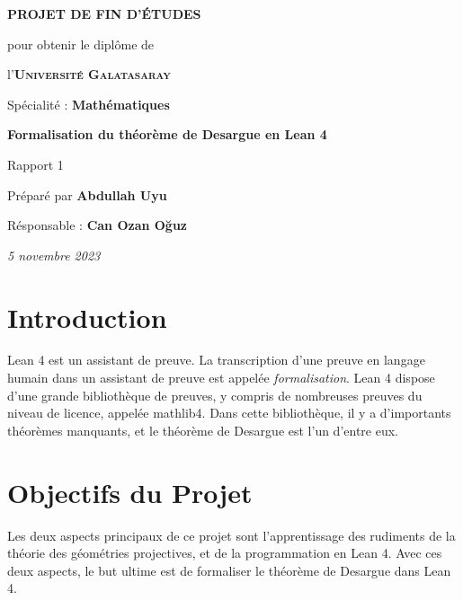 \documentclass[12pt, oneside]{memoir}
\theoremstyle{definition}
\begin{document}
\thispagestyle{empty}
\begin{center}
  \vspace*{\fill}
  

  \vspace{1cm}
  \large{\textbf{PROJET DE FIN D'ÉTUDES}}

  \vspace{0.5cm}
  {\small pour obtenir le diplôme de}

  \vspace{0.5cm}
  l'\textsc{\textbf{Université Galatasaray}}

  {\small Spécialité : \textbf{Mathématiques}}

  \vspace{2.25cm}
  {\Large\textbf{Formalisation du théorème de Desargue en Lean 4}}

  Rapport 1

  \vspace{1.25cm}
  Préparé par \textbf{Abdullah Uyu}

  Résponsable : \textbf{Can Ozan Oğuz}

  \vspace{2.25cm}
  \textit{5 novembre 2023}
  \vspace*{\fill}
\end{center}
\clearpage
{}
\section*{Introduction}
Lean 4 est un assistant de preuve. La transcription d'une preuve en
langage humain dans un assistant de preuve est appelée
\textit{formalisation}. Lean 4 dispose d'une grande bibliothèque de
preuves, y compris de nombreuses preuves du niveau de licence, appelée
mathlib4. Dans cette bibliothèque, il y a d'importants théorèmes
manquants, et le théorème de Desargue est l'un d'entre eux.
\section*{Objectifs du Projet}
Les deux aspects principaux de ce projet sont l'apprentissage des
rudiments de la théorie des géométries projectives, et de la
programmation en Lean 4. Avec ces deux aspects, le but ultime est de
formaliser le théorème de Desargue dans Lean 4.
\end{document}
